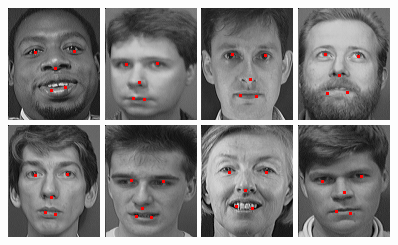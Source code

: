 \begin{figure}[ht]
\begin{center}
 \includegraphics[width=0.15\columnwidth]{ch3/figures/kmeanresult7.png}
 \includegraphics[width=0.15\columnwidth]{ch3/figures/kmeanresult8.png}
 \includegraphics[width=0.15\columnwidth]{ch3/figures/kmeanresult9.png}
 \includegraphics[width=0.15\columnwidth]{ch3/figures/kmeanresult10.png}\\
 \includegraphics[width=0.15\columnwidth]{ch3/figures/kmeanresult11.png}
 \includegraphics[width=0.15\columnwidth]{ch3/figures/kmeanresult12.png}
 \includegraphics[width=0.15\columnwidth]{ch3/figures/kmeanresult13.png}
 \includegraphics[width=0.15\columnwidth]{ch3/figures/kmeanresult14.png}

\end{center}
\end{figure}
